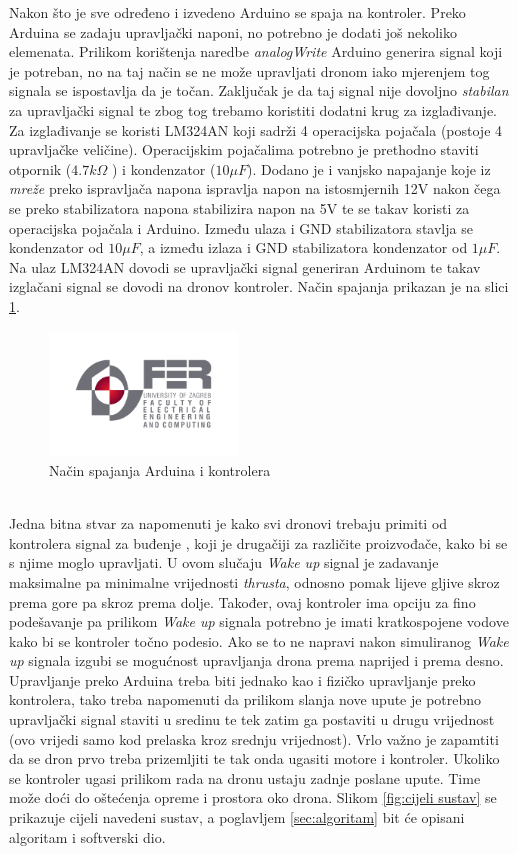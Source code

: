 \documentclass[times, utf8, diplomski]{fer}
\begin{document}
Nakon što je sve određeno i izvedeno Arduino se spaja na kontroler. Preko Arduina se zadaju upravljački naponi, no potrebno je dodati još nekoliko elemenata. Prilikom korištenja naredbe \emph{analogWrite} Arduino generira signal koji je potreban, no na taj način se ne može upravljati dronom iako mjerenjem tog signala se ispostavlja da je točan. Zaključak je da taj signal nije dovoljno \emph{stabilan} za upravljački signal te zbog tog trebamo koristiti dodatni krug za izglađivanje. Za izglađivanje se koristi LM324AN koji sadrži 4 operacijska pojačala (postoje 4 upravljačke veličine). Operacijskim pojačalima potrebno je prethodno staviti otpornik ($4.7k\Omega$ ) i kondenzator ($10 \mu F$). Dodano je i vanjsko napajanje koje iz \emph{mreže} preko ispravljača napona ispravlja napon na istosmjernih 12V nakon čega se preko stabilizatora napona stabilizira napon na 5V te se takav koristi za operacijska pojačala i Arduino. Između ulaza i GND stabilizatora stavlja se kondenzator od $10\mu F$, a između izlaza i GND stabilizatora kondenzator od $1\mu F$. Na ulaz LM324AN dovodi se upravljački signal generiran Arduinom te takav izglačani signal se dovodi na dronov kontroler. Način spajanja prikazan je na slici \ref{fig:spajanje}.
\begin{figure}[htb]
\centering
\includegraphics[width=5cm]{img/fer_logo.jpg}
\caption{Način spajanja Arduina i kontrolera\protect\footnotemark}
\label{fig:spajanje}
\end{figure}\\
Jedna bitna stvar za napomenuti je kako svi dronovi trebaju primiti od kontrolera signal za buđenje , koji je drugačiji za različite proizvođače, kako bi se s njime moglo upravljati. U ovom slučaju \emph{Wake up} signal je zadavanje maksimalne pa minimalne vrijednosti \emph{thrusta}, odnosno pomak lijeve gljive skroz prema gore pa skroz prema dolje. Također, ovaj kontroler ima opciju za fino podešavanje pa prilikom \emph{Wake up} signala potrebno je imati kratkospojene vodove kako bi se kontroler točno podesio. Ako se to ne napravi nakon simuliranog \emph{Wake up} signala izgubi se mogućnost upravljanja drona prema naprijed i prema desno. Upravljanje preko Arduina treba biti jednako kao i fizičko upravljanje preko kontrolera, tako treba napomenuti da prilikom slanja nove upute  je potrebno upravljački signal staviti u sredinu te tek zatim ga postaviti u drugu vrijednost (ovo vrijedi samo kod prelaska kroz srednju vrijednost). Vrlo važno je zapamtiti da se dron prvo treba prizemljiti te tak onda ugasiti motore i kontroler. Ukoliko se kontroler ugasi prilikom rada na dronu ustaju zadnje poslane upute. Time može doći do oštećenja opreme i prostora oko drona. Slikom \ref{fig:cijeli sustav} se prikazuje cijeli navedeni sustav, a poglavljem \ref{sec:algoritam} bit će opisani algoritam i softverski dio.
\end{document}
